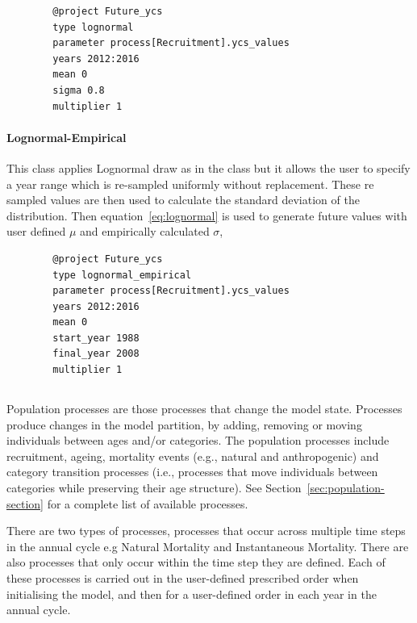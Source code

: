  {\small{\begin{verbatim}
 		@project Future_ycs
 		type lognormal
 		parameter process[Recruitment].ycs_values
 		years 2012:2016
 		mean 0
 		sigma 0.8
 		multiplier 1
 		\end{verbatim}}}


\paragraph*{Lognormal-Empirical}
This class applies Lognormal draw as in the  class but it allows the user to specify a year range which is re-sampled uniformly without replacement. These re sampled values are then used to calculate the standard deviation of the distribution. Then equation~\eqref{eq:lognormal} is used to generate future values with user defined $\mu$ and empirically calculated $\sigma$,

{\small{\begin{verbatim}
		@project Future_ycs
		type lognormal_empirical
		parameter process[Recruitment].ycs_values
		years 2012:2016
		mean 0
		start_year 1988
		final_year 2008
		multiplier 1
		\end{verbatim}}}


\subsection{}

Population processes are those processes that change the model state. Processes produce changes in the model partition, by adding, removing or moving individuals between ages and/or categories. The population processes include recruitment, ageing,  mortality events (e.g., natural and anthropogenic) and category transition processes (i.e., processes that move individuals between categories while preserving their age structure). See Section~\ref{sec:population-section} for a complete list of available processes.

There are two types of processes, processes that occur across multiple time steps in the annual cycle e.g Natural Mortality and Instantaneous Mortality. There are also processes that only occur within the time step they are defined. Each of these processes is carried out in the user-defined prescribed order when initialising the model, and then for a user-defined order in each year in the annual cycle. 

